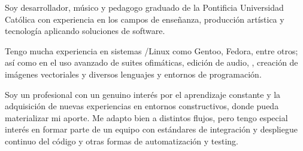 

\begin{cvparagraph}

    Soy desarrollador, músico y pedagogo graduado de la Pontificia Universidad
    Católica con experiencia en los campos de enseñanza, producción artística y
    tecnología aplicando soluciones de software.

    Tengo mucha experiencia en sistemas /Linux como Gentoo, Fedora,
    entre otros; así como en el uso avanzado de suites ofimáticas, edición de
    audio, , creación de imágenes vectoriales y diversos lenguajes y
    entornos de programación.

    Soy un profesional con un genuino interés por el aprendizaje constante y la
    adquisición de nuevas experiencias en entornos constructivos, donde pueda
    materializar mi aporte. Me adapto bien a distintos flujos, pero tengo
    especial interés en formar parte de un equipo con estándares de integración
    y despliegue continuo del código y otras formas de automatización y testing.

\end{cvparagraph}

